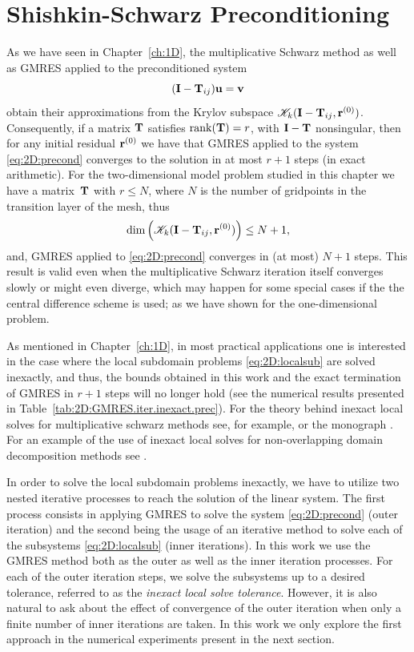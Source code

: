 \section{Shishkin-Schwarz Preconditioning}
\label{2D:precon}

As we have seen in Chapter~\ref{ch:1D}, the multiplicative
Schwarz method as well as GMRES applied to the preconditioned system
\begin{equation}\label{eq:2D:precond}
(\mathbf{I}-\mathbf{T}_{ij})\mathbf{u}=\mathbf{v}
\end{equation}
obtain their approximations from the Krylov subspace
$\mathscr{K}_k(\mathbf{I}-\mathbf{T}_{ij},\mathbf{r}^{(0)})$.
Consequently, if a matrix $\mathbf{T}$ satisfies $\mathrm{rank}(\mathbf{T})=r$, with $\mathbf{I}-\mathbf{T}$
nonsingular, then for any initial residual $\mathbf{r}^{(0)}$ we have that GMRES
applied to the system \eqref{eq:2D:precond} converges to the solution in at
most $r+1$ steps (in exact arithmetic). For the two-dimensional model problem
studied in this chapter we have a matrix~$\mathbf{T}$ with $r\leq N$, where $N$ is the
number of gridpoints in the transition layer of the mesh, thus
\begin{equation}\label{eq:2D:K_rank}
\dim \left(\mathscr{K}_k(\mathbf{I}-\mathbf{T}_{ij},\mathbf{r}^{(0)})\right) \leq N+1,
\end{equation}
and, GMRES applied to \eqref{eq:2D:precond} converges in (at most) $N+1$ steps.
This result is valid even when the multiplicative Schwarz iteration itself
converges slowly or might even diverge, which may happen for some special cases
if the the central difference scheme is used; as we have shown for the
one-dimensional problem.

As mentioned in Chapter~\ref{ch:1D}, in most practical applications one is
interested in the case where the local subdomain problems \eqref{eq:2D:localsub}
are solved inexactly, and thus, the bounds obtained in this work and the exact
termination of GMRES in $r+1$ steps will no longer hold (see the numerical
results presented in Table~\ref{tab:2D:GMRES.iter.inexact.prec}). For the
theory behind inexact local solves for multiplicative schwarz methods see, for
example, \cite{BenFroNabSzy01} or the monograph \cite{SmiBjoGro96}. For an
example of the use of inexact local solves for non-overlapping domain
decomposition methods see \cite{BraPasVass98}.

In order to solve the local subdomain problems inexactly, we have to utilize
two nested iterative processes to reach the solution of the linear system.
The first process consists in applying GMRES to solve the system
\eqref{eq:2D:precond} (outer iteration) and the second being the usage
of an iterative method to solve each of the subsystems \eqref{eq:2D:localsub}
(inner iterations). In this work we use the GMRES method both as the outer as
well as the inner iteration processes. For each of the outer iteration steps,
we solve the subsystems up to a desired tolerance, referred to as the
\textit{inexact local solve tolerance}. However, it is also natural to ask
about the effect of convergence of the outer iteration when only a finite
number of inner iterations are taken. In this work we only explore the first
approach in the numerical experiments present in the next section.


